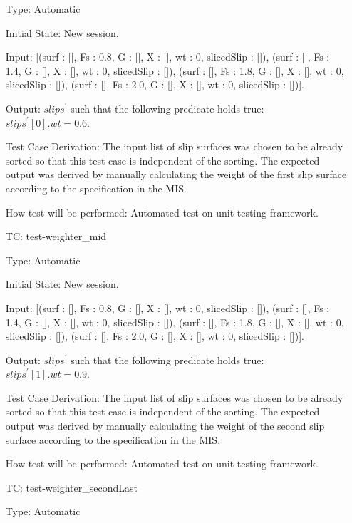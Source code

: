 \documentclass[12pt, titlepage]{article}
\newcounter{utestnum} %
\begin{document}
\begin{enumerate}[label=TC\arabic*:,ref={\arabic*}]
	Type: Automatic
	
	Initial State: New session.
	
	Input: [(surf : [], Fs : 0.8, G : [], X : [], wt : 0, slicedSlip : []), 
	(surf : [], Fs : 1.4, G : [], X : [], wt : 0, slicedSlip : []), 
	(surf : [], Fs : 1.8, G : [], X : [], wt : 0, slicedSlip : []),
	(surf : [], Fs : 2.0, G : [], X : [], wt : 0, slicedSlip : [])].
	
	Output: $\textit{slips}^\prime$ such that the following predicate holds 
	true:\\ 
	$\textit{slips}^\prime[0].wt = 0.6$.

	Test Case Derivation: The input list of slip surfaces was chosen to be 
	already 
	sorted so that this test case is independent of the sorting. The expected 
	output was derived by manually calculating the weight of the first slip 
	surface according to the specification in the MIS.

	How test will be performed: Automated test on unit testing framework.
	
	\item [TC\refstepcounter{utestnum}\theutestnum: \label{TC_WeighterMid}] 
	test-weighter\_mid
	
	Type: Automatic
	
	Initial State: New session.
	
	Input: [(surf : [], Fs : 0.8, G : [], X : [], wt : 0, slicedSlip : []), 
	(surf : [], Fs : 1.4, G : [], X : [], wt : 0, slicedSlip : []), 
	(surf : [], Fs : 1.8, G : [], X : [], wt : 0, slicedSlip : []), 
	(surf : [], Fs : 2.0, G : [], X : [], wt : 0, slicedSlip : [])].
	
	Output: $\textit{slips}^\prime$ such that the following predicate holds 
	true:\\ 
	$\textit{slips}^\prime[1].wt = 0.9$.
	
	Test Case Derivation: The input list of slip surfaces was chosen to be 
	already 
	sorted so that this test case is independent of the sorting. The expected 
	output was derived by manually calculating the weight of the second slip 
	surface according to the specification in the MIS.
	
	How test will be performed: Automated test on unit testing framework.
	
	\item [TC\refstepcounter{utestnum}\theutestnum: 
	\label{TC_WeighterSecondLast}] 
	test-weighter\_secondLast
	
	Type: Automatic
	

\end{enumerate}
\end{document}
